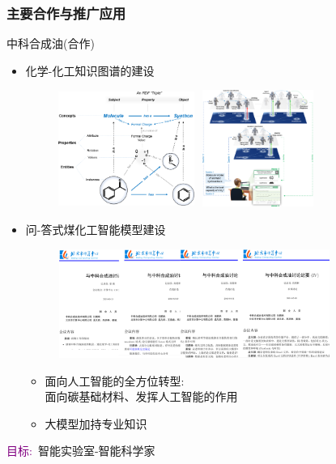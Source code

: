 \begin{frame}[allowframebreaks]
	\frametitle{主要合作与推广应用}
		中科合成油(合作)
	\begin{itemize}
	 \setlength{\itemsep}{30pt}
	\item 化学-化工知识图谱的建设
\begin{figure}[h!]
\centering
\includegraphics[height=1.50in,width=1.75in,viewport=0 0 950 790,clip]{Figures/Mapping-the-relationship-between-molecule-and-synthon.png}
\hspace{5pt}
\includegraphics[height=1.50in,width=1.55in,viewport=0 0 750 790,clip]{Figures/TWA-KG-Marie.png}
\label{Fig:Mapping-relationship-molecule-synthon}
\end{figure}
	\begin{itemize}
{\fontsize{7.5pt}{5.5pt}}
	\end{itemize}
	\item 问-答式煤化工智能模型建设
\begin{figure}[h!]
\centering
\includegraphics[height=1.40in,width=3.50in,viewport=0 0 1986 800,clip]{Figures/MeetingRecord_SCTC-BCC.png}
\label{Fig:Meeting_Record}
\end{figure}
\begin{itemize}
	\item 面向人工智能的全方位转型:\\
		面向碳基础材料、发挥人工智能的作用
	\item 大模型加持专业知识
\end{itemize}
	\end{itemize}
\textcolor{purple}{目标:}~智能实验室-智能科学家
\end{frame}

